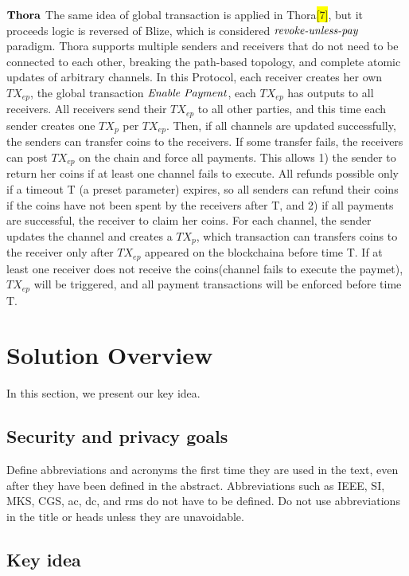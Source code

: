 \documentclass[conference]{IEEEtran}
\begin{document}
 \noindent $\bf{Thora}$   The same idea of global transaction is applied in Thora\colorbox{yellow}{[7]}, but it proceeds logic is reversed of Blize, which is considered 
 $\emph{revoke-unless-pay}$ paradigm. Thora supports multiple senders and receivers that do not need to be connected to each other, 
 breaking the path-based topology, and complete atomic updates of arbitrary channels. In this Protocol, each receiver creates her own $TX_{ep}$, the global transaction $\emph{Enable Payment}$, 
 each $TX_{ep}$ has outputs to all receivers. All receivers send their $TX_{ep}$ to all other parties, and this time each sender creates 
 one $TX_p$ per $TX_{ep}$. Then, if all channels are updated successfully, the senders can transfer coins to the receivers. If some transfer 
 fails, the receivers can post $TX_{ep}$ on the chain and force all payments. This allows 1) the sender to return her coins if at least one 
 channel fails to execute. All refunds possible only if a timeout T (a preset parameter) expires, so all senders can refund 
 their coins if the coins have not been spent by the receivers after T, and 2) if all payments are successful, the receiver to claim her 
 coins. For each channel, the sender updates the channel and creates a $TX_p$, which transaction can transfers coins to the receiver 
 only after $TX_{ep}$ appeared on the blockchaina before time T. If at least one receiver does not receive the coins(channel fails to 
 execute the paymet), $TX_{ep}$ will be triggered, and all payment transactions will be enforced before time T.

 
 
 


\section{Solution Overview}
In this section, we present our key idea.

\subsection{Security and privacy goals}

Define abbreviations and acronyms the first time they are used in the text, 
even after they have been defined in the abstract. Abbreviations such as 
IEEE, SI, MKS, CGS, ac, dc, and rms do not have to be defined. Do not use 
abbreviations in the title or heads unless they are unavoidable.

\subsection{Key idea}
\end{document}
